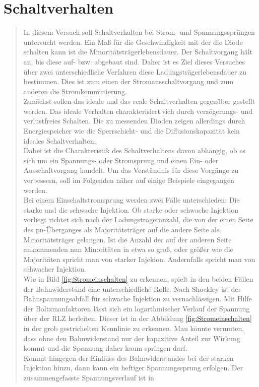 \section{Schaltverhalten}
\begin{quote}

In diesem Versuch soll Schaltverhalten bei Strom- und Spannungssprüngen untersucht werden.
Ein Maß für die Geschwindigkeit mit der die Diode schalten kann ist die Minoritätsträgerlebensdauer.
Der Schaltvorgang hält an, bis diese auf- bzw. abgebaut sind. Daher ist es Ziel dieses Versuches über
zwei unterschiedliche Verfahren diese Ladungsträgerlebensdauer zu bestimmen. Dies ist zum einen der
Stromausschaltvorgang und zum anderen die Stromkommutierung.\\

Zunächst sollen das ideale und das reale Schaltverhalten gegenüber gestellt werden. Das ideale Verhalten
charakterisiert sich durch verzögerungs- und verlustfreies Schalten. Die zu messenden Dioden zeigen allerdings 
durch Energiespeicher wie die Sperrschicht- und die Diffusionskapazität kein ideales Schaltverhalten. \\

Dabei ist die Charakteristik des Schaltverhaltens davon abhängig, ob es sich um ein Spannungs- oder Stromsprung 
und einen Ein- oder Ausschaltvorgang handelt. Um das Verständnis für diese Vorgänge zu verbessern, soll im Folgenden 
näher auf einige Beispiele eingegangen werden.\\

Bei einem Einschaltstromsprung werden zwei Fälle unterschieden: Die starke und die schwache Injektion. Ob starke oder 
schwache Injektion vorliegt richtet sich nach der Ladungsträgeranzahl, die von der einen Seite des pn-Überganges als 
Majoritätsträger auf die andere Seite als Minoritätsträger gelangen. Ist die Anzahl der auf der anderen Seite ankommenden
nun Minoritäten in etwa so groß, oder größer wie die Majoritäten spricht man von starker Injekion. Andernfalls spricht man
von schwacher Injektion.\\
Wie in Bild \ref{fig:Stromeinschalten} zu erkennen, spielt in den beiden Fällen der Bahnwiderstand eine unterschiedliche 
Rolle. Nach Shockley ist der Bahnspannungsabfall für schwache Injektion zu vernachlässigen. Mit Hilfe der Boltzmanfaktoren 
lässt sich ein logarthmischer Verlauf der Spannung über der RLZ herleiten. Dieser ist in der Abbildung \ref{fig:Stromeinschalten}
in der grob gestrichelten Kennlinie zu erkennen. Man könnte vermuten, dass ohne den Bahnwiderstand nur der kapazitive Anteil 
zur Wirkung kommt und die Spannung daher kaum springen darf.\\
Kommt hingegen der Einfluss des Bahnwiderstandes bei der starken Injektion hinzu, dann kann ein heftiger Spannungssprung erfolgen.
Der zusammengefasste Spannungsverlauf ist in


\end{quote}
